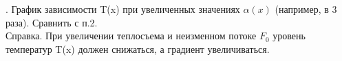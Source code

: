 \documentclass[14pt, a4paper]{extarticle}
\begin{document}
. График зависимости T(x) при увеличенных значениях $\alpha(x)$ (например, в 3 раза). Сравнить с п.2.\\
Справка. При увеличении теплосъема и неизменном потоке $F_0$ уровень температур T(x) должен снижаться, а градиент  увеличиваться.
\begin{figure}[h!]	
\end{figure}\par
\newpage
\begin{figure}[h!]	
\end{figure}\par
\end{document}
